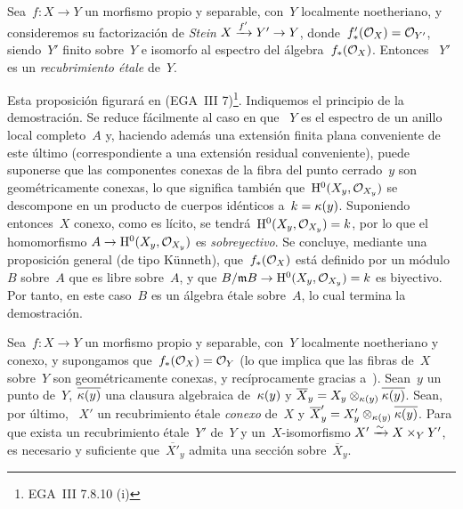 \begin{proposition}
\label{X.1.2}
Sea~$f\colon X\to Y$ un morfismo propio y separable, con~$Y$ localmente
noetheriano, y consideremos su factorización de \emph{Stein}
$X\lto{f'}Y'\dpl\to Y$, donde~$f_*'(\cal{O}_X)=\cal{O}_{Y'}$, siendo~$Y'$
finito sobre~$Y$ e isomorfo al espectro del álgebra~$f_*(\cal{O}_X)$. Entonces
~$Y'$ es un \emph{recubrimiento étale} de~$Y$.
\end{proposition}

Esta proposición figurará en (EGA~III 7)\footnote{\Cf EGA~III 7.8.10 (i)}.
Indiquemos el principio de la demostración. Se reduce fácilmente al caso en que
~$Y$ es el espectro de un anillo local completo~$A$ y, haciendo además una
extensión finita plana conveniente de este último (correspondiente a una
extensión residual conveniente), puede suponerse que las componentes conexas
de la fibra del punto cerrado~$y$ son geométricamente conexas, lo que significa
también que~$\H^0(X_y,\cal{O}_{X_y})$ se descompone en un producto de cuerpos
idénticos a~$k=\kres(y)$. Suponiendo entonces~$X$ conexo, como es lícito, se
tendrá~$\H^0(X_y,\cal{O}_{X_y})=k$, por lo que el homomorfismo
$A\to \H^0(X_y,\cal{O}_{X_y})$ es \emph{sobreyectivo}. Se concluye, mediante
una proposición general (de tipo Künneth), que~$f_*(\cal{O}_X)$ está definido
por un módulo~$B$ sobre~$A$ que es libre sobre~$A$, y que
$B/\goth{m} B\to \H^0(X_y,\cal{O}_{X_y})=k$ es biyectivo. Por tanto, en este
caso~$B$ es un álgebra étale sobre~$A$, lo cual termina la demostración.

\begin{theoreme}
\label{X.1.3}
Sea~$f\colon X\to Y$ un morfismo propio y separable, con~$Y$ localmente
noetheriano y conexo, y supongamos que~$f_*(\cal{O}_X)=\cal{O}_Y$ (lo que
implica que las fibras de~$X$ sobre~$Y$ son geométricamente conexas, y
recíprocamente gracias a~). Sean~$y$ un punto de~$Y$,
$\overline{\kres(y)}$ una clausura algebraica de~$\kres(y)$ y
$\overline X_y=X_y\otimes_{\kres(y)}\overline{\kres(y)}$. Sean, por último,
~$X'$ un recubrimiento étale \emph{conexo} de~$X$ y
$\overline X_y'=X_y'\otimes_{\kres(y)}\overline{\kres(y)}$. Para que exista
un recubrimiento étale~$Y'$ de~$Y$ y un~$X$-isomorfismo
$X'\isomto X\times_Y Y'$, es necesario y suficiente que~$\overline{X'}_y$
admita una sección sobre~$\overline X_y$.
\end{theoreme}

